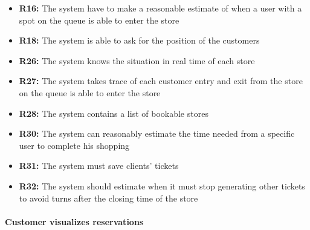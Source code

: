 \documentclass{article}
\begin{document}
\begin{center}
\begin{itemize}
					\item {\bfseries R16: } The system have to make a reasonable estimate of when a user with a spot
on the queue is able to enter the store
					\item {\bfseries R18: } The system is able to ask for the position of the customers
					\item {\bfseries R26: } The system knows the situation in real time of each store

					\item {\bfseries R27: } The system takes trace of each customer entry and exit from the store
on the queue is able to enter the store
					\item {\bfseries R28: } The system contains a list of bookable stores
					\item {\bfseries R30: } The system can reasonably estimate the time needed from a specific user
to complete his shopping

					\item {\bfseries R31: } The system must save clients’ tickets
					\item {\bfseries R32: } The system should estimate when it must stop generating other tickets to
avoid turns after the closing time of the store

					\end{itemize}
				\end{center}
			
			\paragraph{Customer visualizes reservations}
			
\end{document}
